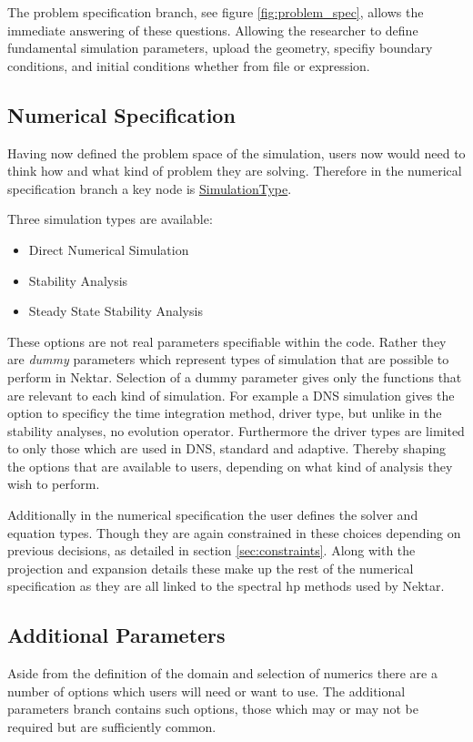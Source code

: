 \documentclass[11pt, a4paper]{report}
\begin{document}
The problem specification branch, see figure \ref{fig:problem_spec}, allows the immediate answering of these questions. Allowing the researcher to define fundamental simulation parameters, upload the geometry, specifiy boundary conditions, and initial conditions whether from file or expression.	

\subsection{Numerical Specification}
Having now defined the problem space of the simulation, users now would need to think how and what kind of problem they are solving. Therefore in the numerical specification branch a key node is \url{SimulationType}.

Three simulation types are available:
\begin{itemize}
\item Direct Numerical Simulation
\item Stability Analysis
\item Steady State Stability Analysis
\end{itemize}

These options are not real parameters specifiable within the code. Rather they are \textit{dummy} parameters which represent types of simulation that are possible to perform in Nektar. Selection of a dummy parameter gives only the functions that are relevant to each kind of simulation. For example a DNS simulation gives the option to specificy the time integration method, driver type, but unlike in the stability analyses, no evolution operator. Furthermore the driver types are limited to only those which are used in DNS, standard and adaptive. Thereby shaping the options that are available to users, depending on what kind of analysis they wish to perform.

Additionally in the numerical specification the user defines the solver and equation types. Though they are again constrained in these choices depending on previous decisions, as detailed in section \ref{sec:constraints}. Along with the projection and expansion details these make up the rest of the numerical specification as they are all linked to the spectral hp methods used by Nektar.

\subsection{Additional Parameters}
Aside from the definition of the domain and selection of numerics there are a number of options which users will need or want to use. The additional parameters branch contains such options, those which may or may not be required but are sufficiently common.
\end{document}
